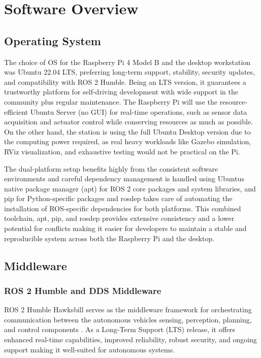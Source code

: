 \documentclass[english,project]{buwthesis}
\begin{document}
\section{Software Overview}

\subsection{Operating System}
The choice of OS for the Raspberry Pi 4 Model B and the desktop workstation was Ubuntu 22.04 LTS, preferring long-term support, stability, security updates, and compatibility with ROS 2 Humble. Being an LTS version, it guarantees a trustworthy platform for self-driving development with wide support in the community plus regular maintenance. The Raspberry Pi will use the resource-efficient Ubuntu Server (no GUI) for real-time operations, such as sensor data acquisition and actuator control while conserving resources as much as possible. On the other hand, the station is using the full Ubuntu Desktop version due to the computing power required, as real heavy workloads like Gazebo simulation, RViz visualization, and exhaustive testing would not be practical on the Pi.

The dual-platform setup benefits highly from the consistent software environments and careful dependency management is handled using Ubuntu\textquotesingle s native package manager (apt) for ROS 2 core packages and system libraries, and pip for Python-specific packages and rosdep takes care of automating the installation of ROS-specific dependencies for both platforms. This combined toolchain, apt, pip, and rosdep provides extensive consistency and a lower potential for conflicts making it easier for developers to maintain a stable and reproducible system across both the Raspberry Pi and the desktop.

\subsection{Middleware}
\subsubsection{ROS 2 Humble and DDS Middleware}

ROS 2 Humble Hawksbill serves as the middleware framework for orchestrating communication between the autonomous vehicle\textquotesingle s sensing, perception, planning, and control components \cite{doi:10.1126/scirobotics.abm6074}. As a Long-Term Support (LTS) release, it offers enhanced real-time capabilities, improved reliability, robust security, and ongoing support making it well-suited for autonomous systems.
\end{document}
